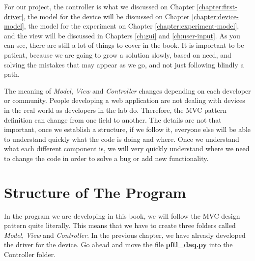For our project, the controller is what we discussed on Chapter \ref{chapter:first-driver}, the model for the device will be discussed on Chapter \ref{chapter:device-model}, the model for the experiment on Chapter \ref{chapter:experiment-model}, and the view will be discussed in Chapters \ref{ch:gui} and \ref{ch:user-input}. As you can see, there are still a lot of things to cover in the book. It is important to be patient, because we are going to grow a solution slowly, based on need, and solving the mistakes that may appear as we go, and not just following blindly a path.


The meaning of \emph{Model}, \emph{View} and \emph{Controller} changes depending on each developer or community. People developing a web application are not dealing with devices in the real world as developers in the lab do. Therefore, the {MVC} pattern definition can change from one field to another. The details are not that important, once we establish a structure, if we follow it, everyone else will be able to understand quickly what the code is doing and where. Once we understand what each different component is, we will very quickly understand where we need to change the code in order to solve a bug or add new functionality.

\section{Structure of The Program}\label{section:structure-of-theprogram}
In the program we are developing in this book, we will follow the MVC design pattern quite literally. This means that we have to create three folders called \emph{Model}, \emph{View} and \emph{Controller}. In the previous chapter, we have already developed the driver for the device. Go ahead and move the file \textbf{pftl\_daq.py} into the Controller folder.


